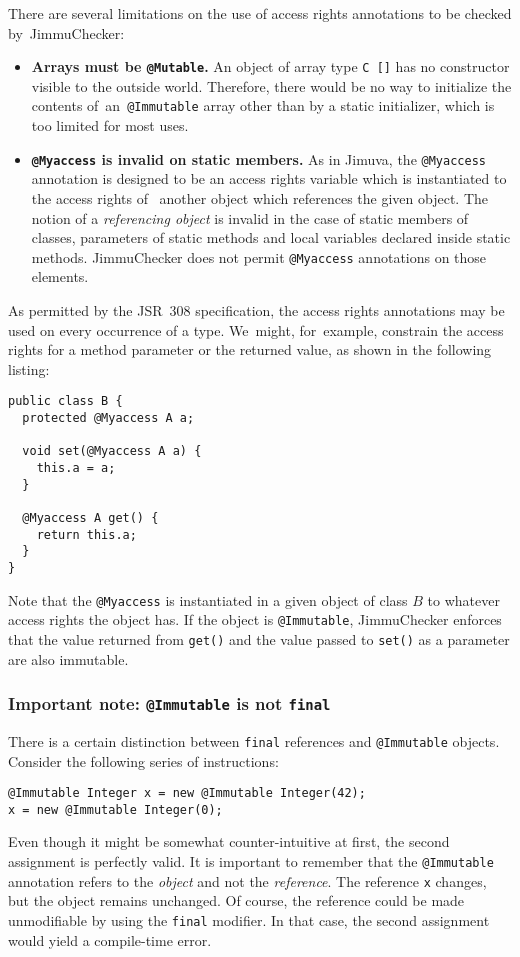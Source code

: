 \documentclass{pracamgr}
\theoremstyle{break}
\theoremstyle{break}
\theoremstyle{break}
\begin{document}
There are several limitations on the use of access rights annotations
to be checked by~JimmuChecker:
\begin{itemize}
\item \textbf{Arrays must be \texttt{@Mutable}.} An object of array
  type \texttt{C []} has no constructor visible to the outside
  world. Therefore, there would be no way to initialize the contents
  of~an~\texttt{@Immutable} array other than by a static initializer,
  which is too limited for most uses.
\item \textbf{\texttt{@Myaccess} is invalid on static members.} As in
  Jimuva, the \texttt{@Myaccess} annotation is designed to be an
  access rights variable which is instantiated to the access rights of~
  another object which references the given object. The notion of a
  \emph{referencing object} is invalid in the case of static members
  of classes, parameters of static methods and local variables
  declared inside static methods. JimmuChecker does not permit
  \texttt{@Myaccess} annotations on those elements. 
\end{itemize}

As permitted by the JSR~308 specification, the access rights
annotations may be used on every occurrence of a type. We~might,
for~example, constrain the access rights for a method parameter or the
returned value, as shown in the following listing:
\begin{lstlisting}
public class B {
  protected @Myaccess A a;

  void set(@Myaccess A a) {
    this.a = a;
  }

  @Myaccess A get() {
    return this.a;
  }
}
\end{lstlisting}
Note that the \texttt{@Myaccess} is instantiated in a given object of
class $B$ to whatever access rights the object has. If the object is
\texttt{@Immutable}, JimmuChecker enforces that the value returned
from \texttt{get()} and the value passed to \texttt{set()} as a
parameter are also immutable.

\subsubsection{Important note: \texttt{@Immutable} is not \texttt{final}}

There is a certain distinction between \texttt{final} references and
\texttt{@Immutable} objects. Consider the following series of
instructions:
\begin{lstlisting}
@Immutable Integer x = new @Immutable Integer(42);
x = new @Immutable Integer(0);
\end{lstlisting}
Even though it might be somewhat counter-intuitive at first, the
second assignment is perfectly valid. It is important to remember that
the \texttt{@Immutable} annotation refers to the \emph{object} and not
the \emph{reference}. The reference \texttt{x} changes, but the object
remains unchanged. Of course, the reference could be made unmodifiable
by using the \texttt{final} modifier. In that case, the second
assignment would yield a compile-time error.
\end{document}
